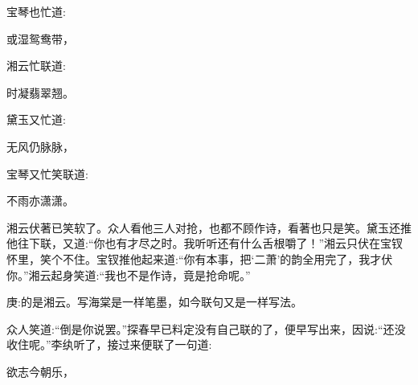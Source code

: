 \begin{parag}
    宝琴也忙道:
\end{parag}


\begin{poem}
    \begin{pl} 或湿鸳鸯带，\end{pl}
\end{poem}


\begin{parag}
    湘云忙联道:
\end{parag}


\begin{poem}
    \begin{pl} 时凝翡翠翘。\end{pl}
\end{poem}


\begin{parag}
    黛玉又忙道:
\end{parag}


\begin{poem}
    \begin{pl} 无风仍脉脉，\end{pl}
\end{poem}


\begin{parag}
    宝琴又忙笑联道:
\end{parag}


\begin{poem}
    \begin{pl} 不雨亦潇潇。\end{pl}
\end{poem}


\begin{parag}
    湘云伏著已笑软了。众人看他三人对抢，也都不顾作诗，看著也只是笑。黛玉还推他往下联，又道:“你也有才尽之时。我听听还有什么舌根嚼了！”湘云只伏在宝钗怀里，笑个不住。宝钗推他起来道:“你有本事，把‘二萧’的韵全用完了，我才伏你。”湘云起身笑道:“我也不是作诗，竟是抢命呢。”\begin{note}庚:的是湘云。写海棠是一样笔墨，如今联句又是一样写法。\end{note}众人笑道:“倒是你说罢。”探春早已料定没有自己联的了，便早写出来，因说:“还没收住呢。”李纨听了，接过来便联了一句道:
\end{parag}


\begin{poem}
    \begin{pl} 欲志今朝乐，\end{pl}
\end{poem}


